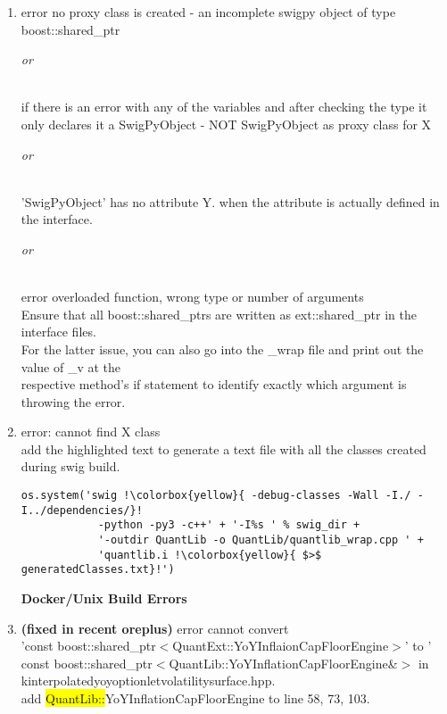 \documentclass[10pt]{article}
\begin{document}
\begin{enumerate}
    \item error no proxy class is created - an incomplete swigpy object of type boost::shared\_ptr\\
        \centerline{ \textit{or} } \\
    if there is an error with any of the variables and after checking the type it only declares it a SwigPyObject - NOT SwigPyObject as proxy class for X \\
        \centerline{ \textit{or} } \\
    'SwigPyObject' has no attribute Y. when the attribute is actually defined in the interface. \\
        \centerline{ \textit{or} } \\
    error overloaded function, wrong type or number of arguments \\
    \-\hspace{1cm} Ensure that all boost::shared\_ptrs are written as ext::shared\_ptr in the interface files. \\
    \-\hspace{1cm} For the latter issue, you can also go into the \_wrap file and print out the value of \_v at the \\ \-\hspace{1cm}respective method's if statement to identify exactly which argument is throwing the error.
    
    \item error: cannot find X class \\
    \-\hspace{1cm} add the highlighted text to generate a text file with all the classes created during swig build.
    \begin{lstlisting}[escapeinside ={\%,}, escapechar={!}]
            os.system('swig !\colorbox{yellow}{ -debug-classes -Wall -I./ -I../dependencies/}!
            -python -py3 -c++' + '-I%s ' % swig_dir + 
            '-outdir QuantLib -o QuantLib/quantlib_wrap.cpp ' +
            'quantlib.i !\colorbox{yellow}{ $>$  generatedClasses.txt}!')
    \end{lstlisting}
    
    \textbf{Docker/Unix Build Errors}
    \item \textbf{(fixed in recent oreplus)} error cannot convert \\ 'const boost::shared\_ptr$<$QuantExt::YoYInflaionCapFloorEngine$>$' to '\\ const boost::shared\_ptr$<$QuantLib::YoYInflationCapFloorEngine\&$>$ in \\ kinterpolatedyoyoptionletvolatilitysurface.hpp.\\
    \-\hspace{1cm} add \colorbox{yellow}{QuantLib::}YoYInflationCapFloorEngine to line 58, 73, 103.\\


\end{enumerate}
\end{document}
